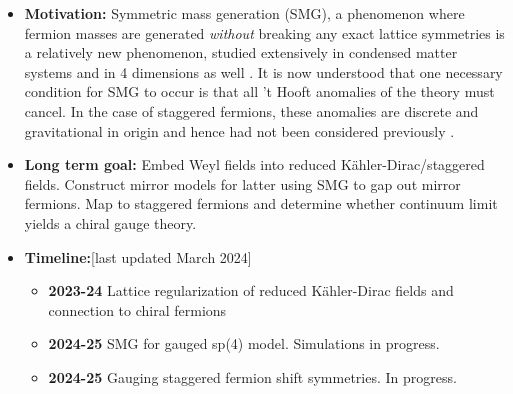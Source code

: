 \documentclass[12pt,hyperpdf]{article}
\begin{document}
\begin{itemize}
\item{\bf Motivation:} Symmetric mass generation (SMG), a phenomenon where fermion masses are generated  {\it without} breaking any exact lattice
symmetries is a relatively new phenomenon, studied extensively in condensed matter systems and in 4 dimensions as well \cite{Butt:2021koj,Hasenfratz:2022qan}. It is
now understood that one necessary condition for SMG to occur is that all 
't Hooft anomalies of the theory must cancel. In the case of
staggered fermions, these anomalies are discrete and gravitational in origin and hence
had not been considered previously \cite{Catterall:2022jky}. 
\item {\bf Long term goal:} Embed Weyl fields into reduced K\"{a}hler-Dirac/staggered fields.
Construct mirror models for latter using SMG to gap
out mirror fermions. Map to staggered fermions and determine whether 
continuum limit yields a chiral gauge theory. 
\item {\bf Timeline:}\hfill [last updated March 2024]
\begin{itemize}
    \item {\bf 2023-24} Lattice regularization of reduced K\"{a}hler-Dirac fields and
    connection to chiral fermions \cite{Catterall:2023nww}
    \item {\bf 2024-25} SMG for gauged sp(4) model. Simulations in progress.
    \item {\bf 2024-25} Gauging staggered fermion shift symmetries. In progress.
    
\end{itemize}
\end{itemize}


\end{document}
